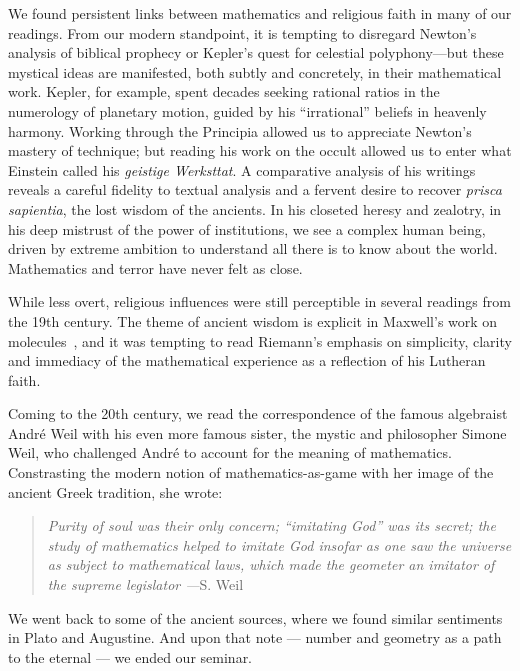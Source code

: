 \documentclass{article}
\begin{document}
We found persistent links between mathematics and religious faith in many of our readings. From our modern standpoint, it is tempting to disregard Newton’s analysis of biblical prophecy or Kepler’s quest for celestial polyphony---but these mystical ideas are manifested, both subtly and concretely, in their mathematical work. Kepler, for example, spent decades seeking rational ratios in the numerology of planetary motion, guided by his ``irrational'' beliefs in heavenly harmony. Working through the Principia allowed us to appreciate Newton’s mastery of technique; but reading his work on the occult allowed us to enter what Einstein called his {\em geistige Werksttat}. A comparative analysis of his writings reveals a careful fidelity to textual analysis and a fervent desire to recover {\em prisca sapientia}, the lost wisdom of the ancients.  In his closeted heresy and zealotry, in his deep mistrust of the power of institutions, we see a complex human being, driven by extreme ambition to understand all there is to know about the world. Mathematics and terror have never felt as close.
 
 

%

%


%
%

While less overt, religious influences were still perceptible in several readings from the 19th century. The theme of ancient wisdom is explicit in  Maxwell’s work on molecules~\cite{maxwell_molecules}, and it was tempting to read  Riemann’s emphasis on simplicity, clarity and immediacy of the mathematical experience as a reflection of his Lutheran faith. 

 

 


 Coming to the 20th century, we read the
    correspondence of the famous algebraist Andr{\'e} Weil with
    his even more famous sister, the  mystic and philosopher Simone Weil,
     who challenged  Andr{\'e} to account for the meaning of mathematics. 
     Constrasting the modern notion of mathematics-as-game with 
     her image of the ancient Greek tradition, she wrote: 

\begin{quote}
    {\em Purity of soul was their only concern; “imitating God” was its secret; the study of mathematics helped to imitate God insofar as one saw the universe as subject to mathematical laws, which made the geometer an imitator of the supreme legislator ---}S. Weil \cite{weil_correspondence}
\end{quote}
We went back to some of the ancient  sources, where we found similar
sentiments in Plato and Augustine. And upon that note --- number and geometry as a path to the eternal ---  we ended our seminar.
 
\end{document}
